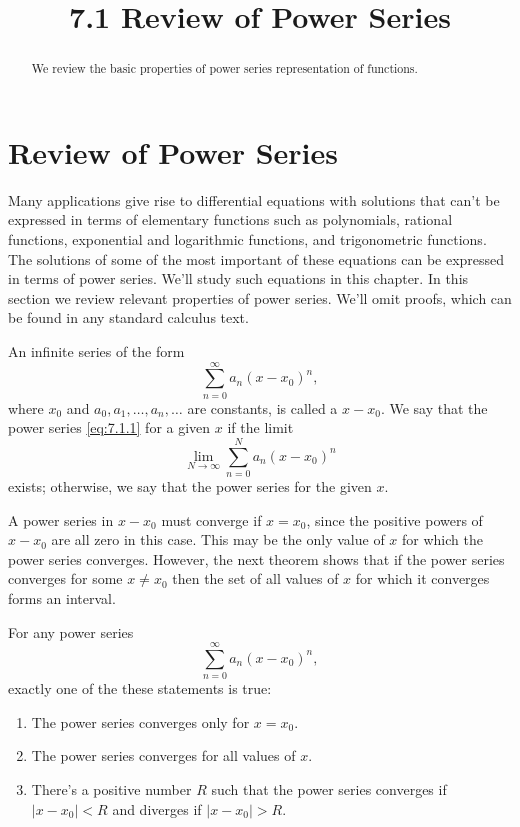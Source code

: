 \documentclass{ximera}
\title{7.1 Review of Power Series}%
\begin{document}
\begin{abstract}
We review the basic properties of power series representation of functions.
\end{abstract}

\maketitle

\section*{Review of Power Series}

Many applications give rise to differential equations with solutions
that can't be expressed in terms of elementary functions such as
polynomials, rational functions, exponential and logarithmic
functions, and trigonometric functions. The solutions of some of the
most important of these equations can be expressed in terms of power
series. We'll study such equations in this chapter. In this section
we review relevant properties of power series. We'll omit proofs,
which can be found in any standard calculus text.

\begin{definition}\label{thmtype:7.1.1}
An infinite series of the form
\begin{equation} \label{eq:7.1.1}
\sum_{n=0}^\infty a_n(x-x_0)^n,
\end{equation}
where $x_0$ and $a_0, a_1, \dots, a_n, \dots$ are constants, is
called a
 $x-x_0$. We say that the power series
\eqref{eq:7.1.1}  for a given $x$ if the limit
$$
\lim_{N\rightarrow\infty}
\sum_{n=0}^Na_n(x-x_0)^n
$$
exists; otherwise, we say that the power series   for
the given $x$.
\end{definition}

A power series in $x-x_0$ must converge if $x=x_0$, since the positive
powers of $x-x_0$ are all zero in this case. This may be the only
value of $x$ for which the power series converges. However, the
next theorem shows that if the power series converges for some
$x\neq
x_0$ then the set of all values of $x$ for which it converges forms an interval.

\begin{theorem}\label{thmtype:7.1.2}
For any power series
$$
\sum_{n=0}^\infty a_n(x-x_0)^n,
$$
exactly one of the these statements is true$:$
\begin{enumerate}
\item\label{item:7.1.2a} %
The power series converges  only for $x=x_0.$
\item\label{item:7.1.2b} %
The power series converges for all values of $x.$
\item\label{item:7.1.2c} %
There's a positive number $R$ such that  the power series
converges if $|x-x_0|<R$ and diverges if  $|x-x_0|>R$.
\end{enumerate}
\end{theorem}
\end{document}
